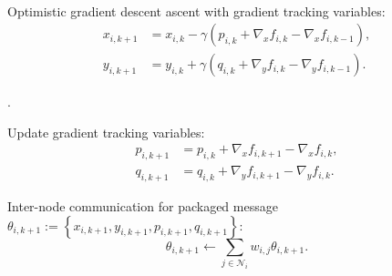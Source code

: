 \documentclass[letterpaper, 10 pt, conference]{ieeeconf}
\begin{document}
\begin{algorithm}
\caption{\textbf{Distributed Optimistic Gradient Tracking (DOGT)}}
\begin{algorithmic}[1]\label{Alg_DOST}
\renewcommand{\algorithmicrequire}{\textbf{Initialization: }}
\

\STATE Optimistic gradient descent ascent with gradient tracking variables:
\begin{equation*}
\begin{aligned}
x_{i,k+1}&=x_{i,k}-\gamma \left( {p_{i,k}}+\nabla _xf_{i,k}-\nabla _xf_{i,k-1} \right) ,
\\
y_{i,k+1}&=y_{i,k}+\gamma \left( {q_{i,k}}+\nabla _yf_{i,k}-\nabla _yf_{i,k-1} \right) .
\end{aligned}
\end{equation*}

.

\STATE Update gradient tracking variables:
\begin{equation*}
\begin{aligned}
p_{i,k+1}&={p_{i,k}}+\nabla _xf_{i,k+1}-\nabla _xf_{i,k},
\\
q_{i,{k+1}}&=q_{i,k}+\nabla _yf_{i,k+1}-\nabla _yf_{i,k}.
\end{aligned}
\end{equation*}

\STATE Inter-node communication for packaged message $\theta _{i,k+1}:=\left\{ x_{i,k+1}, y_{i,k+1}, p_{i,k+1}, q_{i,k+1} \right\} $:
\begin{equation*}
\theta _{i,k+1}\gets \sum_{j\in \mathcal{N} _i}{w_{i,j}\theta _{i,k+1}}.
\end{equation*}
\ENDFOR
\end{algorithmic}
\end{algorithm}
\end{document}
